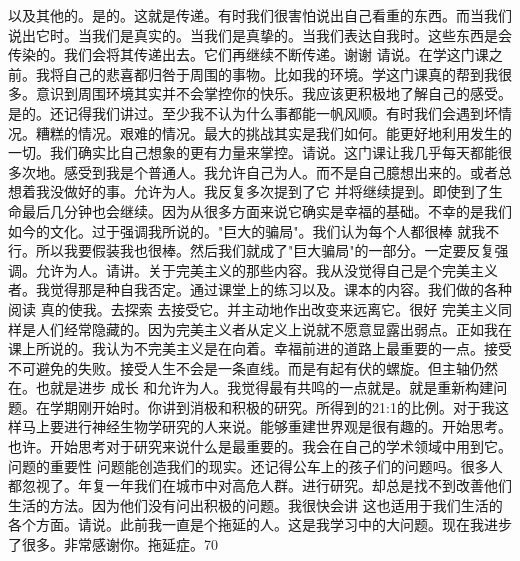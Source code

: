 以及其他的。是的。这就是传递。有时我们很害怕说出自己看重的东西。而当我们说出它时。当我们是真实的。当我们是真挚的。当我们表达自我时。这些东西是会传染的。我们会将其传递出去。它们再继续不断传递。谢谢 请说。在学这门课之前。我将自己的悲喜都归咎于周围的事物。比如我的环境。学这门课真的帮到我很多。意识到周围环境其实并不会掌控你的快乐。我应该更积极地了解自己的感受。是的。还记得我们讲过。至少我不认为什么事都能一帆风顺。有时我们会遇到坏情况。糟糕的情况。艰难的情况。最大的挑战其实是我们如何。能更好地利用发生的一切。我们确实比自己想象的更有力量来掌控。请说。这门课让我几乎每天都能很多次地。感受到我是个普通人。我允许自己为人。而不是自己臆想出来的。或者总想着我没做好的事。允许为人。我反复多次提到了它 并将继续提到。即使到了生命最后几分钟也会继续。因为从很多方面来说它确实是幸福的基础。不幸的是我们如今的文化。过于强调我所说的。"巨大的骗局"。我们认为每个人都很棒 就我不行。所以我要假装我也很棒。然后我们就成了"巨大骗局"的一部分。一定要反复强调。允许为人。请讲。关于完美主义的那些内容。我从没觉得自己是个完美主义者。我觉得那是种自我否定。通过课堂上的练习以及。课本的内容。我们做的各种阅读 真的使我。去探索 去接受它。并主动地作出改变来远离它。很好 完美主义同样是人们经常隐藏的。因为完美主义者从定义上说就不愿意显露出弱点。正如我在课上所说的。我认为不完美主义是在向着。幸福前进的道路上最重要的一点。接受不可避免的失败。接受人生不会是一条直线。而是有起有伏的螺旋。但主轴仍然在。也就是进步 成长 和允许为人。我觉得最有共鸣的一点就是。就是重新构建问题。在学期刚开始时。你讲到消极和积极的研究。所得到的21:1的比例。对于我这样马上要进行神经生物学研究的人来说。能够重建世界观是很有趣的。开始思考。也许。开始思考对于研究来说什么是最重要的。我会在自己的学术领域中用到它。问题的重要性 问题能创造我们的现实。还记得公车上的孩子们的问题吗。很多人都忽视了。年复一年我们在城市中对高危人群。进行研究。却总是找不到改善他们生活的方法。因为他们没有问出积极的问题。我很快会讲 这也适用于我们生活的各个方面。请说。此前我一直是个拖延的人。这是我学习中的大问题。现在我进步了很多。非常感谢你。拖延症。70%